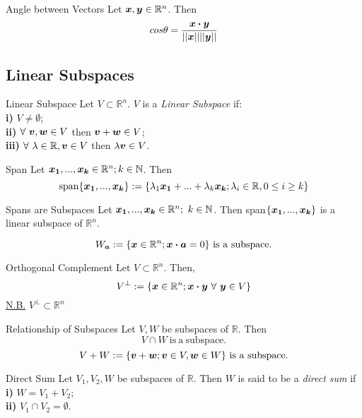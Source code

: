 \documentclass[11pt,a4paper]{article}
\begin{document}
\subtitle{Theorem 2.10 - }{Angle between Vectors}
Let $\boldsymbol{x}, \boldsymbol{y} \in \mathbb{R}^n$. Then $$cos\theta = \frac{\boldsymbol{x} \boldsymbol{\cdot} \boldsymbol{y}}{||\boldsymbol{x}|| ||\boldsymbol{y}||}$$

\subsection{Linear Subspaces}
%
\subtitle{Definition 2.11 - }{Linear Subspace}
Let $V \subset \mathbb{R}^n$. $V$ is a \textit{Linear Subspace} if: \\
\textbf{i)} $V \not = \emptyset$; \\
\textbf{ii)} $\forall\ \boldsymbol{v}, \boldsymbol{w} \in V$ then $\boldsymbol{v} + \boldsymbol{w} \in V$; \\
\textbf{iii)} $\forall\ \lambda \in \mathbb{R}, \boldsymbol{v} \in V$ then $\lambda\boldsymbol{v} \in V$. \\

\subtitle{Definition 2.12 - }{Span}
Let $\boldsymbol{x_1}, ... , \boldsymbol{x_k} \in \mathbb{R}^n; k \in \mathbb{N}$. Then
$$\mathrm{span}\{\boldsymbol{x_1}, ... , \boldsymbol{x_k}\} := \{\lambda_1\boldsymbol{x_1} + ... + \lambda_k\boldsymbol{x_k}; \lambda_i \in \mathbb{R}, 0 \leq i \geq k\}$$

\subtitle{Definition 2.13 - }{Spans are Subspaces}
Let $\boldsymbol{x_1}, ... , \boldsymbol{x_k} \in \mathbb{R}^n;\ k \in \mathbb{N}$. Then span$\{\boldsymbol{x_1}, ... , \boldsymbol{x_k}\}$ is a linear subspace of $\mathbb{R}^n$.

\subtitle{Theorem 2.15}{}
$$W_{\vect{a}} := \{\vect{x} \in \mathbb{R}^n; \vect{x} \dotprod \vect{a} = 0\}\mathrm{\ is\ a\ subspace.}$$

\subtitle{Definition 2.16 - }{Orthogonal Complement}
Let $V \subset \mathbb{R}^n$. Then,
$$V^{\perp} := \{\boldsymbol{x} \in \mathbb{R}^n; \boldsymbol{x} \boldsymbol{\cdot} \boldsymbol{y}\ \forall\ \boldsymbol{y} \in V\}$$
\underline{N.B.} $V^{\perp} \subset \mathbb{R}^n$

\subtitle{Theorem 2.17 - }{Relationship of Subspaces}
Let $V, W$ be subspaces of $\mathbb{R}$. Then
$$V \cap W \mathrm{\ is\ a\ subspace.}$$
$$V+W := \{\boldsymbol{v} + \boldsymbol{w}; \boldsymbol{v} \in V, \boldsymbol{w} \in W\}\mathrm{\ is\ a\ subspace.}$$

\subtitle{Definition 2.18 - }{Direct Sum}
Let $V_1, V_2, W$ be subspaces of $\mathbb{R}$. Then $W$ is said to be a \textit{direct sum} if \\
\textbf{i)} $W = V_1 + V_2$; \\
\textbf{ii)} $V_1 \cap V_2 = \emptyset$. \\
\end{document}

